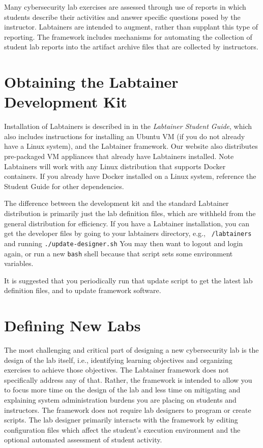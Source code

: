 \documentclass[12pt]{article}
\begin{document}
Many cybersecurity lab exercises are assessed through use of reports in which students
describe their activities and answer specific questions posed by the instructor.  Labtainers
are intended to augment, rather than supplant this type of reporting.  The framework includes
mechanisms for automating the collection of student lab reports into the artifact archive files
that are collected by instructors. 

\section {Obtaining the Labtainer Development Kit}
Installation of Labtainers is described in in the \textit{Labtainer Student Guide},  
which also includes instructions for installing an Ubuntu VM (if you do not already have a Linux system),
and the Labtainer framework.  Our website also distributes pre-packaged VM appliances that already have
Labtainers installed. Note Labtainers will work with any Linux
distribution that supports Docker containers.  If you already have Docker installed on a Linux system, 
reference the Student Guide for other dependencies. 

The difference between the development kit and the standard Labtainer distribution is primarily
just the lab definition files, which are withheld from the general distribution for efficiency.
If you have a Labtainer installation, you can get the developer files by going to your
labtainers directory, e.g., {\tt ~/labtainers} and running {\tt ./update-designer.sh}
You may then want to logout and login again, or run a new {\tt bash} shell because that script
sets some environment variables.

It is suggested that you periodically run that update script to get the latest lab definition files,
and to update framework software.   

\section {Defining New Labs}
\label{sec:new_labs}
The most challenging and critical part of designing a new cybersecurity lab
is the design of the lab itself, i.e., identifying learning objectives and
organizing exercises to achieve those objectives.  The Labtainer framework
does not specifically address any of that.  Rather, the framework is intended
to allow you to focus more time on the design of the lab and less time on mitigating and
explaining system administration burdens you are placing on students and instructors.
The framework does not require lab designers to program or create scripts.  The
lab designer primarily interacts with the framework by editing configuration files
which affect the student's execution environment and the optional automated
assessment of student activity.
\end{document}
